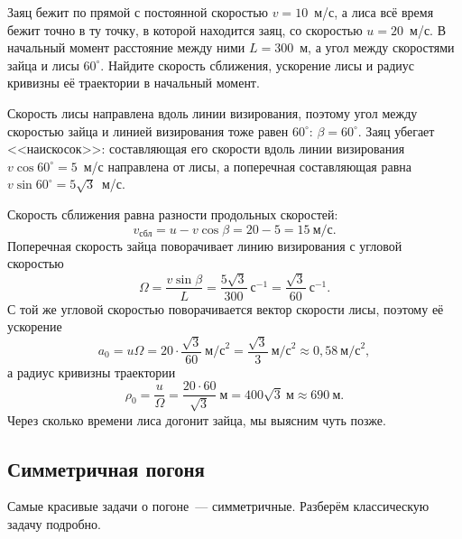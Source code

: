 \documentclass[../main.tex]{subfiles}
\begin{document}
\begin{example}
Заяц бежит по прямой с постоянной скоростью $v = 10$~м/с, а лиса всё время бежит
точно в ту точку, в которой находится заяц, со скоростью $u = 20$~м/с. В начальный
момент расстояние между ними $L = 300$~м, а угол между скоростями зайца и лисы
$60^\circ$.\label{ex:pur_fox} Найдите скорость сближения, ускорение лисы и радиус кривизны её
траектории в начальный момент.

Скорость лисы направлена вдоль линии визирования, поэтому угол между скоростью зайца
и линией визирования тоже равен $60^\circ$: $\beta = 60^\circ$. Заяц убегает <<наискосок>>:
составляющая его скорости вдоль линии визирования $v\cos 60^\circ = 5$~м/с направлена
от лисы, а поперечная составляющая равна $v\sin 60^\circ = 5\sqrt{3}$~м/с.

Скорость сближения равна разности продольных скоростей:
\[
v_{\text{сбл}} = u - v\cos\beta = 20 - 5 = 15~\text{м/с}.
\]
Поперечная скорость зайца поворачивает линию визирования с угловой скоростью
\[
\Omega = \frac{v\sin\beta}{L} = \frac{5\sqrt{3}}{300}~\text{с}^{-1} = \frac{\sqrt{3}}{60}~\text{с}^{-1}.
\]
С той же угловой скоростью поворачивается вектор скорости лисы, поэтому её ускорение
\[
a_0 = u\Omega = 20\cdot\frac{\sqrt{3}}{60}~\text{м/с}^2 = \frac{\sqrt{3}}{3}~\text{м/с}^2
\approx 0{,}58~\text{м/с}^2,
\]
а радиус кривизны траектории
\[
\rho_0 = \frac{u}{\Omega} = \frac{20\cdot 60}{\sqrt{3}}~\text{м} = 400\sqrt{3}~\text{м}
\approx 690~\text{м}.
\]
Через сколько времени лиса догонит зайца, мы выясним чуть позже.
\end{example}

\subsection{Симметричная погоня}

Самые красивые задачи о погоне~--- симметричные. Разберём классическую задачу
подробно.
\end{document}

